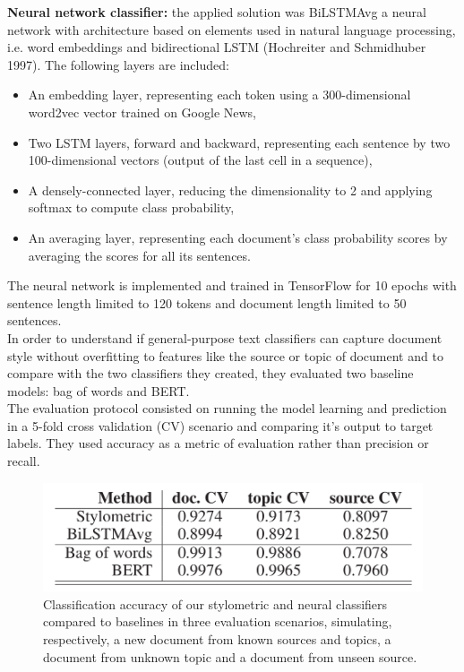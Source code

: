 \documentclass[10pt, english]{report}
\begin{document}
\textbf{Neural network classifier:} the applied solution was BiLSTMAvg a neural network with architecture based on elements used in natural language processing, i.e. word embeddings \cite{mikolov2013efficient} and bidirectional LSTM (Hochreiter and Schmidhuber 1997). The following layers are included:
	\begin{itemize}
	\item An embedding layer, representing each token using a 300-dimensional word2vec vector trained on Google News,
	\item Two LSTM layers, forward and backward, representing each sentence by two 100-dimensional vectors (output of the last cell in a sequence),
	\item A densely-connected layer, reducing the dimensionality to 2 and applying softmax to compute class probability,
	\item An averaging layer, representing each document’s class probability scores by averaging the scores for all its sentences.
	\end{itemize}
The neural network is implemented and trained in TensorFlow for 10 epochs with sentence length limited to 120 tokens and document length limited to 50 sentences.\\

In order to understand if general-purpose text classifiers can capture document style without overfitting to features like the source or topic of document and to compare with the two classifiers they created, they evaluated two baseline models: bag of words and BERT.\\

The evaluation protocol consisted on running the model learning and prediction in a 5-fold cross validation (CV) scenario and comparing it's output to target labels. They used accuracy as a metric of evaluation rather than precision or recall.

\begin{figure}[H]
	\centering
	\includegraphics[scale=0.3]{img/styled_model_result.png}
	\caption{Classiﬁcation accuracy of our stylometric and neural classiﬁers compared to baselines in three evaluation scenarios, simulating, respectively, a new document from known sources and topics, a document from unknown topic and a document from unseen source. \cite{przybyla2020capturing}}
\end{figure}
\end{document}

